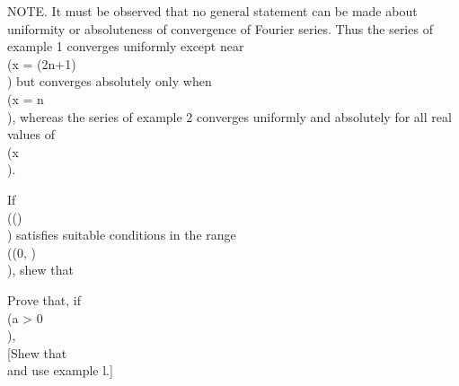 NOTE. It must be observed that no general statement can be made about
uniformity or absoluteness of convergence of Fourier series. Thus the
series of  example 1 %
converges uniformly except near \\(x = (2n+1)\pi\\)
but converges absolutely only when \\(x = n\pi\\), whereas the series of
 example 2 %
converges uniformly and absolutely for all real values
of \\(x\\).
\begin{wandwexample}
 If \\(\phi(\theta)\\) satisfies suitable conditions in the range \\((0, \pi)\\),
shew that
\\[ \begin{align*}
  \lim_{m \rightarrow \infty}
  \int_{0}^{\pi}\!
  \frac{\sin (2m+1)\theta}{\sin \theta}
  \phi(\theta) \, d \theta
  =&
  \lim_{m \rightarrow \infty}
  \int_{0}^{\frac{1}{2} \pi}\!
  \frac{\sin (2m+1)\theta}{\sin \theta}
  \phi(\theta) \, d \theta
  \\
  & \quad
  +
  \lim_{m \rightarrow \infty}
  \int_{0}^{\frac{1}{2} \pi}\!
  \frac{\sin (2m+1)\theta}{\sin \theta}
  \phi(\pi - \theta) \, d \theta
  \\
  &
  = \frac{1}{2} \pi \left\{
    \phi(+0) + \phi(\pi - 0)
  \right\}.
\end{align*} \\]
\end{wandwexample}
\begin{wandwexample}
 Prove that, if \\(a > 0\\),
 \\[ 
 \lim_{m \rightarrow \infty}
 \int_{0}^{\infty}\!
 \frac{\sin (2n+1)\theta}{\sin \theta}
 e^{-a\theta}
 \, d \theta
 =
 \frac{1}{2} \pi \coth \frac{1}{2} a \pi.
 \\] 
 [Shew that
 \\[ \begin{align*}
   \int_{0}^{\infty}\!
   \frac{\sin (2n+1)\theta}{\sin \theta}
   e^{-a\theta} \, d \theta
   =&
   \lim_{m \rightarrow \infty}
   \int_{0}^{m \pi}\!
   \frac{\sin (2n+1)\theta}{\sin \theta}
   e^{-a\theta} \, d \theta
   \\
   =&
   \lim_{m \rightarrow \infty}
   \int_{0}^{\pi}\!
   \frac{\sin (2n+1)\theta}{\sin \theta}
   \left\{
     e^{-a \theta}
     + e^{-a(\theta + \pi)}
     + \cdots
     + e^{-a(\theta + m \pi)}
   \right\} \, d \theta
   \\
   =&
   \int_{0}^{\pi}\!
   \frac{\sin (2n+1)\theta}{\sin \theta}
   \frac{e^{-a \theta} \, d \theta}{1 - e^{-a\pi}},
 \end{align*} \\]
 and use example l.] %
\end{wandwexample}
